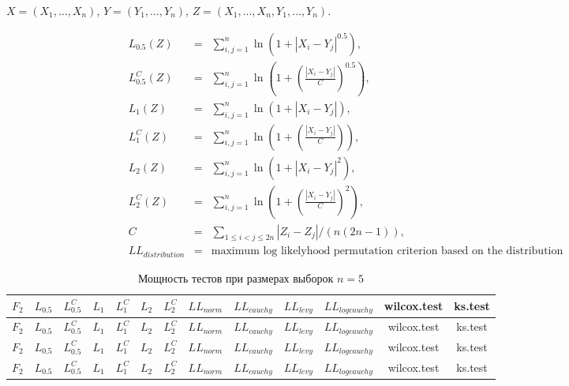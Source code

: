 \documentclass{article}
\begin{document}
$X=(X_1,\ldots,X_n)$, $Y=(Y_1,\ldots,Y_n)$, $Z=(X_1,\ldots,X_n,Y_1,\ldots,Y_n)$.

\begin{eqnarray}
  \label{L0.5}
  L_{0.5}(Z)&=&\sum_{i,j=1}^{n}{\ln(1+|X_{i}-Y_{j}|^{0.5})},\\
  \label{L0.5C}
  L_{0.5}^C(Z)&=&\sum_{i,j=1}^{n}{\ln\left(1+\left(\frac{|X_{i}-Y_{j}|}{C}\right)^{0.5}\right)},\\
  \label{L1}
  L_1(Z)&=&\sum_{i,j=1}^{n}{\ln(1+|X_{i}-Y_{j}|)},\\
  \label{L1C}
  L_1^C(Z)&=&\sum_{i,j=1}^{n}{\ln\left(1+\left(\frac{|X_{i}-Y_{j}|}{C}\right)\right)},\\
  \label{L2}
  L_2(Z)&=&\sum_{i,j=1}^{n}{\ln(1+|X_{i}-Y_{j}|^2)},\\
  \label{L2C}
  L_2^C(Z)&=&\sum_{i,j=1}^{n}{\ln\left(1+\left(\frac{|X_{i}-Y_{j}|}{C}\right)^2\right)},\\
  \label{C}
  C&=&\sum_{1\le i<j\le 2n}{|Z_{i}-Z_{j}|}/(n(2n-1)),\\
  \label{LL}
  LL_{distribution} &=& \text{maximum log likelyhood permutation criterion based on the distribution}
\end{eqnarray}

\begin{longtable}{|c|c|c|c|c|c|c|c|c|c|c|c|c|}
  \caption{Мощность тестов при размерах выборок $n=5$}
  \label{table:n5} \\
  \hline
  $F_2$ & $L_{0.5}$ & $L_{0.5}^C$ & $L_{1}$ & $L_{1}^C$ & $L_{2}$ & $L_{2}^C$ & $LL_{norm}$ & $LL_{cauchy}$ & $LL_{levy}$ & $LL_{logcauchy}$ & wilcox.test & ks.test \\ \hline
  
  
  
  
  $F_2$ & $L_{0.5}$ & $L_{0.5}^C$ & $L_{1}$ & $L_{1}^C$ & $L_{2}$ & $L_{2}^C$ & $LL_{norm}$ & $LL_{cauchy}$ & $LL_{levy}$ & $LL_{logcauchy}$ & wilcox.test & ks.test \\ \hline
  
  
  
  
  $F_2$ & $L_{0.5}$ & $L_{0.5}^C$ & $L_{1}$ & $L_{1}^C$ & $L_{2}$ & $L_{2}^C$ & $LL_{norm}$ & $LL_{cauchy}$ & $LL_{levy}$ & $LL_{logcauchy}$ & wilcox.test & ks.test \\ \hline
  
  
  
  
  $F_2$ & $L_{0.5}$ & $L_{0.5}^C$ & $L_{1}$ & $L_{1}^C$ & $L_{2}$ & $L_{2}^C$ & $LL_{norm}$ & $LL_{cauchy}$ & $LL_{levy}$ & $LL_{logcauchy}$ & wilcox.test & ks.test \\ \hline
  
  
  
  
\end{longtable}
\end{document}
